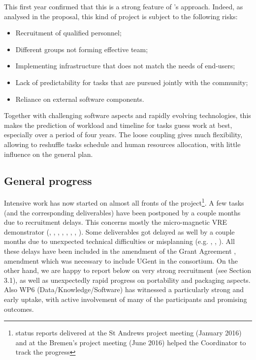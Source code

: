 \documentclass{deliverablereport}
\begin{document}
This first year confirmed that this is a strong feature of \ODK's
approach. Indeed, as analysed in the proposal, this kind of project is
subject to the following risks:
\begin{itemize}
\item Recruitment of qualified personnel;
\item Different groups not forming effective team;
\item Implementing infrastructure that does not match the needs of end-users;
\item Lack of predictability for tasks that are pursued jointly with
  the community;
\item Reliance on external software components.
\end{itemize}
Together with challenging software aspects and rapidly evolving
technologies, this makes the prediction of workload and timeline for
tasks guess work at best, especially over a period of four years. The
loose coupling gives much flexibility, allowing to reshuffle tasks
schedule and human resources allocation, with little influence on the
general plan.

\subsection{General progress}

Intensive work has now started on almost all fronts of the project\footnote{status reports delivered at the St Andrews project meeting (January 2016) and at the Bremen's project meeting (June 2016) helped the Coordinator to track the progress}. A
few tasks (and the corresponding deliverables) have been postponed by
a couple months due to recruitment delays. This concerns mostly the
micro-magnetic VRE demonstrator (, ,
 , , , ,
 , ). Some deliverables got delayed as well
by a couple months due to unexpected technical difficulties or
misplanning (e.g. ,
, ). All these delays have been included in the amendment of the Grant Agreement
, amendment which was necessary to include UGent in the consortium. On
the other hand, we are happy to report below on very strong
recruitment (see Section 3.1), as well as unexpectedly rapid
progress on portability and packaging aspects. Also WP6
(Data/Knowledge/Software) has witnessed a particularly strong and
early uptake, with active involvement of many of the participants and
promising outcomes.
\end{document}
